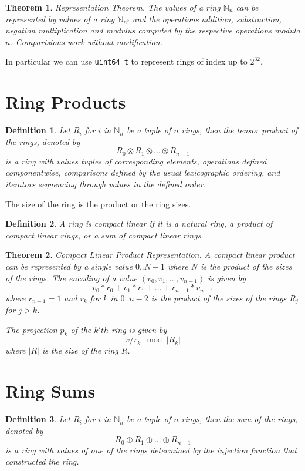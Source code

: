 \documentclass{article}
\newtheorem{theorem}{Theorem}
\newtheorem{definition}{Definition}
\begin{document}
\begin{theorem}
{\em Representation Theorem}. The values of a ring $\mathbb{N}_n$ can be represented
by values of a ring $\mathbb{N}_{n^2}$ and the operations addition, substraction, negation
multiplication and modulus computed by the respective operations modulo $n$. Comparisions
work without modification.
\end{theorem}
In particular we can use \verb$uint64_t$ to represent rings of index up to 
$2^{32}$.

\section{Ring Products}
\begin{definition}
Let $R_i$ for $i$ in $\mathbb{N}_n$ be a tuple of $n$ rings, then the
{\em tensor product} of the rings, denoted by
$$R_0 \otimes R_1 \otimes ... \otimes R_{n-1}$$
is a ring with values tuples of corresponding elements, operations
defined componentwise, comparisons defined by the usual lexicographic
ordering, and iterators sequencing through values in the defined order.
\end{definition}
The size of the ring is the product or the ring sizes.

\begin{definition}
A ring is compact linear if it is a natural ring, a product
of compact linear rings, or a sum of compact linear rings.
\end{definition}

\begin{theorem} {\em Compact Linear Product Representation}.
A compact linear product can be represented by a single value
$0..{N-1}$ where $N$ is the product of the sizes of the rings.
The encoding of a value $(v_0, v_1, ... ,v_{n-1})$ is given by
$$v_0 * r_0 + v_1 * r_1 + ... + r_{n-1} * v_{n-1}$$
where $r_{n-1}=1$ and $r_k$ for $k$ in $0..n-2$ is the product of the sizes of the rings
$R_j$ for $j>k$.

The projection $p_k$ of the $k'th$ ring is given by $$v / r_k \mod |R_k|$$
where $|R|$ is the size of the ring $R$.
\end{theorem}


\section{Ring Sums}
\begin{definition}
Let $R_i$ for $i$ in $\mathbb{N}_n$ be a tuple of $n$ rings, then the
{\em sum} of the rings, denoted by
$$R_0 \oplus R_1 \oplus ... \oplus R_{n-1}$$
is a ring with values of one of the rings determined
by the injection function that constructed the ring.
\end{definition}
\end{document}
